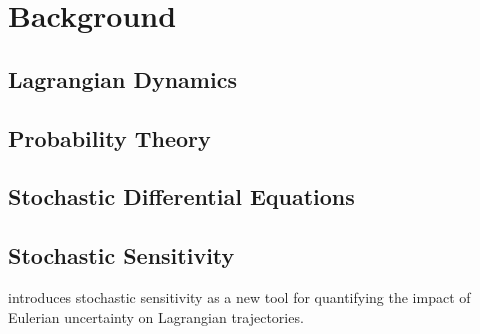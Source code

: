 
\chapter{Background}

\section{Lagrangian Dynamics}

\section{Probability Theory}

\citep{Bremaud_2020_ProbabilityTheoryStochastic}


\section{Stochastic Differential Equations}

\citep{KallianpurSundar_2014_StochasticAnalysisDiffusion}

\section{Stochastic Sensitivity}

\cite{Balasuriya_2020_StochasticSensitivityComputable} introduces stochastic sensitivity as a new tool for quantifying the impact of Eulerian uncertainty on Lagrangian trajectories.



